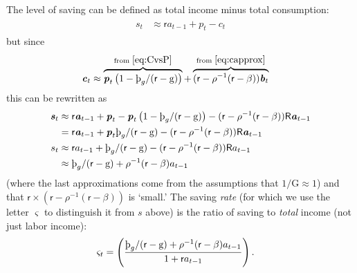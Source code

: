 \documentclass{scrartcl}
\begin{document}
The level of saving can be defined as total income minus total consumption:
\begin{equation}\begin{gathered}\begin{aligned}
  \boldsymbol{\mathit{s}}_{t} & \approx  \mathsf{r} \boldsymbol{\mathit{a}}_{t-1} + \boldsymbol{\mathit{p}}_{t} - \boldsymbol{\mathit{c}}_{t}
\end{aligned}\end{gathered}\end{equation}
but since 
\begin{equation}\begin{gathered}\begin{aligned}
  \label{eq:cFromHandB}
  \boldsymbol{\mathit{c}}_{t} & \approx  \overbrace{\boldsymbol{\mathit{p}}_{t} \left(1 - \text{\thorn}_{g}/(\mathsf{r} - \mathrm{g})\right)}^{\text{from }\eqref{eq:CvsP}}+\overbrace{(\mathsf{r}-\rho^{-1}(\mathsf{r}-\beta))\boldsymbol{\mathit{b}}_{t}}^{\text{from }\eqref{eq:capprox}}
\end{aligned}\end{gathered}\end{equation}
this can be rewritten as
\begin{equation}\begin{gathered}\begin{aligned}
 \boldsymbol{\mathit{s}}_{t} & \approx  \mathsf{r} \boldsymbol{\mathit{a}}_{t-1} + \boldsymbol{\mathit{p}}_{t}- \boldsymbol{\mathit{p}}_{t} \left(1 - \text{\thorn}_{g}/(\mathsf{r} - \mathrm{g})\right) - (\mathsf{r}-\rho^{-1}(\mathsf{r}-\beta))\mathsf{R} \boldsymbol{\mathit{a}}_{t-1}
\\ & =  \mathsf{r} \boldsymbol{\mathit{a}}_{t-1} + \boldsymbol{\mathit{p}}_{t} \text{\thorn}_{g}/(\mathsf{r} - \mathrm{g})- (\mathsf{r}-\rho^{-1}(\mathsf{r}-\beta))\mathsf{R}\boldsymbol{\mathit{a}}_{t-1}
\\ s_{t} & \approx  \mathsf{r} a_{t-1} + \text{\thorn}_{g}/(\mathsf{r} - \mathrm{g})- (\mathsf{r}-\rho^{-1}(\mathsf{r}-\beta))\mathsf{R} a_{t-1}
\\ & \approx  \text{\thorn}_{g}/(\mathsf{r} - \mathrm{g})+ \rho^{-1}(\mathsf{r}-\beta)a_{t-1}
\end{aligned}\end{gathered}\end{equation}
(where the last approximations come from the assumptions that $1/\ensuremath{\mathrm{G}} \approx 1$) and that $\mathsf{r} \times (\mathsf{r}-\rho^{-1}(\mathsf{r}-\beta))$ is `small.'
The saving \textit{rate} (for which we use the letter $\varsigma$ to distinguish it from $s$ above) is the ratio of saving to \textit{total} income (not just labor income):
\begin{equation}\begin{gathered}\begin{aligned}
\varsigma_{t} & =  \left(\frac{\text{\thorn}_{g}/(\mathsf{r} - \mathrm{g})+ \rho^{-1}(\mathsf{r}-\beta)a_{t-1}}{1+ \mathsf{r} a_{t-1}}\right).
\end{aligned}\end{gathered}\end{equation}
\end{document}
